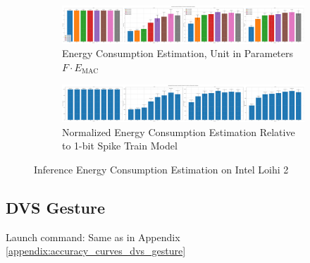         \begin{figure}[H]
            \centering
            \begin{subfigure}[H]{\textwidth}
                \includegraphics[width=\textwidth]{../standard/NMNIST/plots/nmnist_test_energy_nh.pdf}
                \caption{Energy Consumption Estimation, Unit in Parameters $F\cdot E_{\text{MAC}}$}
            \end{subfigure}
            \hfill
            \begin{subfigure}[H]{\textwidth}
                \includegraphics[width=\textwidth]{../standard/NMNIST/plots/nmnist_test_relative_energy_nh.pdf}
                \caption{Normalized Energy Consumption Estimation Relative to 1-bit Spike Train Model}
            \end{subfigure}
            \caption{Inference Energy Consumption Estimation on Intel Loihi 2}
        \end{figure}

    \subsection{DVS Gesture}
    \label{appendix:energy_neuromorphic_dvs_gesture}
        Launch command: Same as in Appendix \ref{appendix:accuracy_curves_dvs_gesture}

